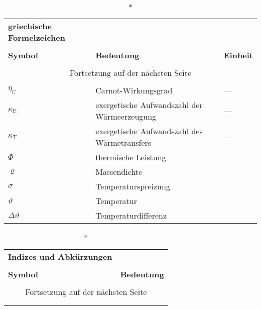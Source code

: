 \begin{onehalfspacing}
\begin{longtable}[h]{p{} p{} p{}}
\end{longtable}

\begin{longtable}[h]{p{} p{} p{}}
		\caption*{\textbf{griechische Formelzeichen}} \\
		\\
		\textbf{Symbol} & \textbf{Bedeutung} & \textbf{Einheit} \\ %
		\endhead
		\\
		\multicolumn{3}{c}{Fortsetzung auf der nächsten Seite} \\
		\endfoot
		\multicolumn{3}{c}{ } \\
		\endlastfoot
		
		$\eta_{C}$ & Carnot-Wirkungsgrad & ---\\
		$\kappa_{\mathrm{E}}$ & exergetische Aufwandszahl der Wärmeerzeugung & ---\\
		$\kappa_{\mathrm{T}}$ & exergetische Aufwandszahl des Wärmetransfers & ---\\
		$\Phi$ & thermische Leistung & \watt\\
		$\varrho$& Massendichte&\kilogrampercubicmetre\\
			$\sigma$&Temperaturspreizung&\kelvin\\
		$\vartheta $ & Temperatur  & \degreecelsius\\
		$\Delta\vartheta $ & Temperaturdifferenz  &\kelvin\\
		
\end{longtable}

\begin{longtable}[h]{p{} p{}}
		\caption*{\textbf{Indizes und Abkürzungen}} \\
		\\
		\textbf{Symbol} & \textbf{Bedeutung} \\ %
		\endhead
		\\
		\multicolumn{2}{c}{Fortsetzung auf der nächsten Seite} \\
		\endfoot
		\multicolumn{2}{c}{ } \\
		\endlastfoot
		

\end{longtable}
\end{onehalfspacing}
